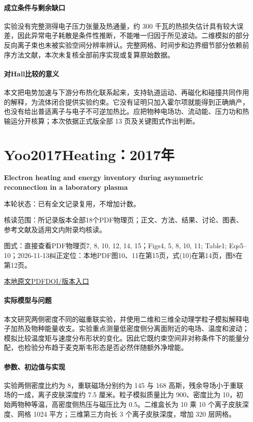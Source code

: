 \paragraph{成立条件与剩余缺口}实验没有完整测得电子压力张量及热通量，约 300 千瓦的热损失估计具有较大误差，因此异常电子耗散是条件性推断，不能唯一归因于所见波动。二维模拟的部分反向离子束也未被实验空间分辨率辨认。完整网格、时间步和边界细节部分依赖前序方法文献，本次未复核全部前序实现或复算原始数据。

\paragraph{对Hall比较的意义}本文把电势加速与下游分布热化联系起来，支持轨道运动、再磁化和碰撞共同作用的解释，为流体闭合提供实验约束。它没有证明只加入霍尔项就能得到正确熵产，也没有给出普适离子与电子不可逆加热比。应把物种电场功、流动能、压力功和热输运分开核算；本次依据正式版全部 13 页及关键图式作出判断。

\section{Yoo2017Heating：2017年}\label{paper:Yoo2017Heating}

\textbf{Electron heating and energy inventory during asymmetric reconnection in a laboratory plasma}\citep{Yoo2017Heating}

\textsf{本轮状态：}已有全文记录复用，不增加计数。

\textsf{核读范围：}所记录版本全部18个PDF物理页；正文、方法、结果、讨论、图表、参考文献及适用文内附录均核读。\par\textsf{图式：}直接查看PDF物理页7, 8, 10, 12, 14, 15；Figs4, 5, 8, 10, 11;  Table1;  Eqs5–10；2026-11-13纠正定位：本地PDF图10、11在第15页，式(10)在第14页，图8在第12页。

\href{run:../../papers/Yoo2017Heating.pdf}{本地原文PDF}\quad\href{https://doi.org/10.1002/2017JA024152}{DOI/版本入口}

\paragraph{实际模型与问题}本文研究两侧密度不同的磁重联实验，并使用二维和三维全动理学粒子模拟解释电子加热及物种能量收支。实验重点测量低密度侧分离面附近的电场、温度和波动；模拟比较温度矩与速度分布形状的变化。因此它既约束空间非对称条件下的能量分配，也检验分布趋于麦克斯韦形态是否必然伴随额外净增能。

\paragraph{参数、初边值与实现}实验两侧密度比约为 8，重联磁场分别约为 145 与 168 高斯，残余导场小于重联场的一成，离子皮肤深度约 7.5 厘米。粒子模拟质量比为 900、密度比为 10，初始两物种等温，高密度侧热压与磁压比为 0.5。二维盒长为 10 乘 10 个离子皮肤深度、网格 1024 平方；三维第三方向长 3 个离子皮肤深度，增加 320 层网格。

